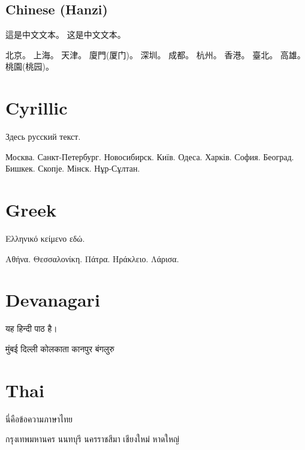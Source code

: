 \documentclass[a4paper]{article}
\begin{document}
\subsection{Chinese (Hanzi)}
\begin{chinese}
這是中文文本。
这是中文文本。

北京。
上海。
天津。
廈門(厦门)。
深圳。
成都。
杭州。
香港。
臺北。
高雄。
桃園(桃园)。
\end{chinese}

\section{Cyrillic}
\begin{russian}
Здесь русский текст.

Москва.
Санкт-Петербург.
Новосибирск.
Київ.
Одеса.
Харків.
София.
Београд.
Бишкек.
Скопје.
Мінск.
Нұр-Сұлтан.
\end{russian}

\section{Greek}
\begin{greek}
Ελληνικό κείμενο εδώ.

Αθήνα.
Θεσσαλονίκη.
Πάτρα.
Ηράκλειο.
Λάρισα.
\end{greek}

\section{Devanagari}
\begin{hindi}
यह हिन्दी पाठ है।

मुंबई
दिल्ली
कोलकाता
कानपुर
बंगलुरु
\end{hindi}

\section{Thai}
\begin{thai}
นี่คือข้อความภาษาไทย

กรุงเทพมหานคร
นนทบุรี
นครราชสีมา
เชียงใหม่
หาดใหญ่
\end{thai}
\end{document}
